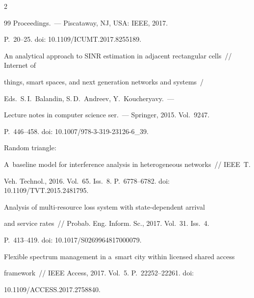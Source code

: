 \begin{multicols}{2}
{{\begin{thebibliography}{99}
Proceedings.~--- Piscataway, NJ, USA: IEEE, 2017. 


P.~20--25. doi: 10.1109/ICUMT.2017.8255189.







 An analytical approach to SINR estimation in adjacent rectangular cells~// Internet of 


things, smart spaces, and next generation networks and systems~/


Eds.\ S.\,I.~Balandin, S.\,D.~Andreev, Y.~Koucheryavy.~---


Lecture notes in computer  science ser.~--- Springer, 2015. Vol.~9247. 


P.~446--458. doi: 10.1007/978-3-319-23126-6\_39.







 Random triangle: 


A~baseline model for interference analysis in heterogeneous networks~// IEEE~T.  


Veh. Technol., 2016. Vol.~65. Iss.~8. P.~6778--6782. doi: 10.1109/TVT.2015.2481795.







 Analysis of multi-resource loss system with state-dependent arrival 


and service rates~// Probab.  Eng. Inform. Sc., 2017. Vol.~31. Iss.~4.  


P.~413--419. doi: 10.1017/S0269964817000079.







 Flexible spectrum management in a~smart city within licensed shared access 


framework~// IEEE Access, 2017. Vol.~5. P.~22252--22261. doi: 


10.1109/ACCESS.2017.2758840.


 \end{thebibliography}





 }


 }





\end{multicols}





